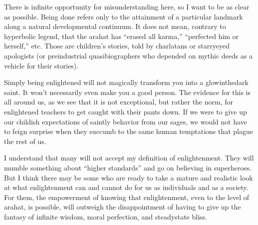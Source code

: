 \documentclass[a5paper,10pt,english]{book}
\begin{document}
\sphinxAtStartPar
There is infinite opportunity for misunderstanding here, so I want to be
as clear as possible. Being done refers only to the attainment of a
particular landmark along a natural developmental continuum. It does not
mean, contrary to hyperbolic legend, that the arahat has “erased all
karma,” “perfected him or herself,” etc. Those are children’s stories,
told by charlatans or starry\sphinxhyphen{}eyed apologists (or pre\sphinxhyphen{}industrial
quasi\sphinxhyphen{}biographers who depended on mythic deeds as a vehicle for their
stories).

\sphinxAtStartPar
Simply being enlightened will not magically transform you into a
glow\sphinxhyphen{}in\sphinxhyphen{}the\sphinxhyphen{}dark saint. It won’t necessarily even make you a good
person. The evidence for this is all around us, as we see that it is not
exceptional, but rather the norm, for enlightened teachers to get caught
with their pants down. If we were to give up our childish expectations
of saintly behavior from our sages, we would not have to feign surprise
when they succumb to the same human temptations that plague the rest of
us.

\sphinxAtStartPar
I understand that many will not accept my definition of enlightenment.
They will mumble something about “higher standards” and go on believing
in superheroes. But I think there may be some who are ready to take a
mature and realistic look at what enlightenment can and cannot do for us
as individuals and as a society. For them, the empowerment of knowing
that enlightenment, even to the level of arahat, is possible, will
outweigh the disappointment of having to give up the fantasy of infinite
wisdom, moral perfection, and steady\sphinxhyphen{}state bliss.
\end{document}

